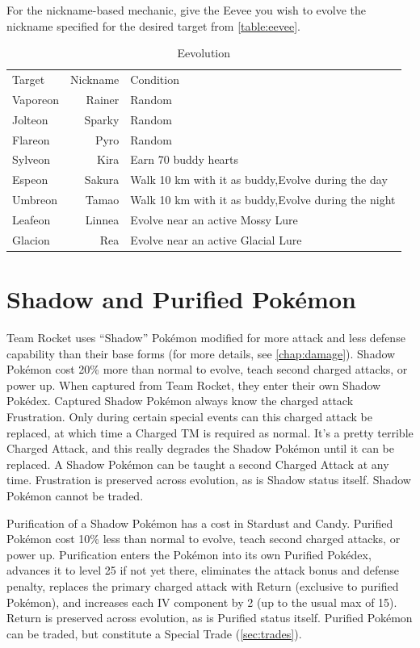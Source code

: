 For the nickname-based mechanic, give the Eevee you wish to evolve the nickname
  specified for the desired target from \autoref{table:eevee}.
\begin{table}
  \begin{center}
    \begin{tabular}{lrp{}}
      Target & Nickname & Condition\\
      \Midrule
      Vaporeon & Rainer & Random\\
      Jolteon & Sparky & Random\\
      Flareon & Pyro & Random\\
      Sylveon & Kira & Earn 70 buddy hearts \\
      Espeon & Sakura & Walk 10 km with it as buddy,\newline Evolve during the day\\
      Umbreon & Tamao & Walk 10 km with it as buddy,\newline Evolve during the night\\
      Leafeon & Linnea & Evolve near an active Mossy Lure\\
      Glacion & Rea & Evolve near an active Glacial Lure\\
    \end{tabular}
  \end{center}
  \caption{Eevolution}
  \label{table:eevee}
\end{table}

\section{Shadow and Purified Pokémon}
\label{sec:shadow}
Team Rocket uses ``Shadow'' Pokémon modified for more attack
 and less defense capability than their base forms (for more details,
 see \autoref{chap:damage}).
Shadow Pokémon cost 20\% more than normal to evolve, teach second charged attacks, or power up.
When captured from Team Rocket, they enter their own Shadow Pokédex.
Captured Shadow Pokémon always know the charged attack Frustration.
Only during certain special events can this charged attack be replaced,
 at which time a Charged TM is required as normal.
It's a pretty terrible Charged Attack, and this really degrades the
 Shadow Pokémon until it can be replaced.
A Shadow Pokémon can be taught a second Charged Attack at any time.
Frustration is preserved across evolution, as is Shadow status itself.
Shadow Pokémon cannot be traded.

Purification of a Shadow Pokémon has a cost in Stardust and Candy.
Purified Pokémon cost 10\% less than normal to evolve, teach second charged attacks, or power up.
Purification enters the Pokémon into its own Purified Pokédex,
 advances it to level 25 if not yet there,
 eliminates the attack bonus and defense penalty,
 replaces the primary charged attack with Return (exclusive to purified Pokémon),
 and increases each IV component by 2  (up to the usual max of 15).
Return is preserved across evolution, as is Purified status itself.
Purified Pokémon can be traded, but constitute a Special Trade (\autoref{sec:trades}).

